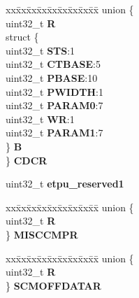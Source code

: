 \begin{DoxyCompactItemize}
\begin{tabbing}
\end{tabbing}\item 
\mbox{\label{structETPU__tag_a3e87d2c9b150f74c08f166ab9ebe46e6}} 
\begin{tabbing}
xx\=xx\=xx\=xx\=xx\=xx\=xx\=xx\=xx\=\kill
union \{\\
\>uint32\_t {\bfseries R}\\
\>struct \{\\
\>\>uint32\_t {\bfseries STS}:1\\
\>\>uint32\_t {\bfseries CTBASE}:5\\
\>\>uint32\_t {\bfseries PBASE}:10\\
\>\>uint32\_t {\bfseries PWIDTH}:1\\
\>\>uint32\_t {\bfseries PARAM0}:7\\
\>\>uint32\_t {\bfseries WR}:1\\
\>\>uint32\_t {\bfseries PARAM1}:7\\
\>\} {\bfseries B}\\
\} {\bfseries CDCR}\\

\end{tabbing}\item 
\mbox{\label{structETPU__tag_a38cfa10e472b0653f9e633c2c47bd19b}} 
uint32\+\_\+t {\bfseries etpu\+\_\+reserved1}
\item 
\mbox{\label{structETPU__tag_a5454b153a750f1511e10e085c676e783}} 
\begin{tabbing}
xx\=xx\=xx\=xx\=xx\=xx\=xx\=xx\=xx\=\kill
union \{\\
\>uint32\_t {\bfseries R}\\
\} {\bfseries MISCCMPR}\\

\end{tabbing}\item 
\mbox{\label{structETPU__tag_ab3499459d61dd0085cbd33d023aeded3}} 
\begin{tabbing}
xx\=xx\=xx\=xx\=xx\=xx\=xx\=xx\=xx\=\kill
union \{\\
\>uint32\_t {\bfseries R}\\
\} {\bfseries SCMOFFDATAR}\\


\end{tabbing}
\end{DoxyCompactItemize}
